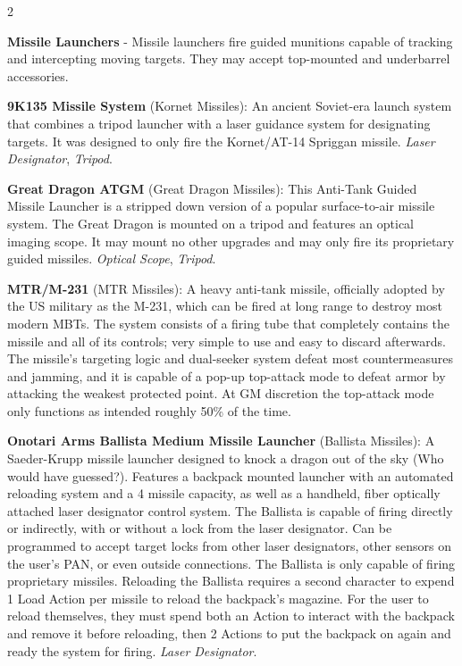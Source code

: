\documentclass[
  oneside]{article}
\begin{document}
\begin{multicols}{2}

\textbf{Missile Launchers} - Missile launchers
fire guided munitions capable of tracking and
intercepting moving targets. They may accept
top-mounted and underbarrel accessories.

\textbf{9K135 Missile System} (Kornet Missiles):
An ancient Soviet-era launch system that combines
a tripod launcher with a laser guidance system for
designating targets. It was designed to only fire
the Kornet/AT-14 Spriggan missile. \emph{Laser
Designator}, \emph{Tripod}.

\textbf{Great Dragon ATGM} (Great Dragon
Missiles): This Anti-Tank Guided Missile Launcher
is a stripped down version of a popular
surface-to-air missile system. The Great Dragon is
mounted on a tripod and features an optical
imaging scope. It may mount no other upgrades and
may only fire its proprietary guided missiles.
\emph{Optical Scope}, \emph{Tripod}.

\textbf{MTR/M-231} (MTR Missiles): A heavy
anti-tank missile, officially adopted by the US
military as the M-231, which can be fired at long
range to destroy most modern MBTs. The system
consists of a firing tube that completely contains
the missile and all of its controls; very simple
to use and easy to discard afterwards. The
missile's targeting logic and dual-seeker system
defeat most countermeasures and jamming, and it is
capable of a pop-up top-attack mode to defeat
armor by attacking the weakest protected point. At
GM discretion the top-attack mode only functions
as intended roughly 50\% of the time.

\textbf{Onotari Arms Ballista Medium Missile
Launcher} (Ballista Missiles): A Saeder-Krupp
missile launcher designed to knock a dragon out of
the sky (Who would have guessed?). Features a
backpack mounted launcher with an automated
reloading system and a 4 missile capacity, as well
as a handheld, fiber optically attached laser
designator control system. The Ballista is capable
of firing directly or indirectly, with or without
a lock from the laser designator. Can be
programmed to accept target locks from other laser
designators, other sensors on the user's PAN, or
even outside connections. The Ballista is only
capable of firing proprietary missiles. Reloading
the Ballista requires a second character to expend
1 Load Action per missile to reload the backpack's
magazine. For the user to reload themselves, they
must spend both an Action to interact with the
backpack and remove it before reloading, then 2
Actions to put the backpack on again and ready the
system for firing. \emph{Laser Designator}.


\end{multicols}
\end{document}
